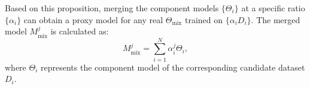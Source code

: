 
Based on this proposition, merging the component models $\{\Theta_i\}$ at a specific ratio $\{\alpha_i\}$ can obtain a proxy model for any real $\Theta_{\text{mix}}$ trained on $\{\alpha_i D_i\}$. 
The merged model $M_\text{{mix}}^j$ is calculated as:
\begin{equation}
\label{merge_equation}
    M_\text{mix}^j=\sum_{i=1}^N \alpha_i^j \Theta_i,
\end{equation}
where $\Theta_i$ represents the component model of the corresponding candidate dataset $D_i$.